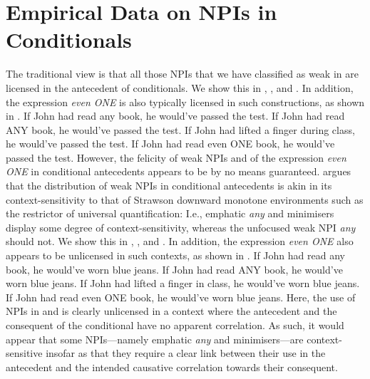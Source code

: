 \section{Empirical Data on NPIs in Conditionals}
The traditional view is that all those NPIs that we have classified as weak in  \parencite{Ladusaw1980,Wouden1997,Jeong2021,Jeong2022} are licensed in the antecedent of conditionals. We show this in , , and . In addition, the expression \textit{even \MakeUppercase{one}} is also typically licensed in such constructions, as shown in .
\pex[nopreamble=true]\label{ex:npi-conditional-good}%
\a{} If John had read any book, he would've passed the test.
\a{} If John had read \MakeUppercase{any} book, he would've passed the test.
\a{} If John had lifted a finger during class, he would've passed the test.
\a{} If John had read even \MakeUppercase{one} book, he would've passed the test.
\xe
However, the felicity of weak NPIs and of the expression \textit{even \MakeUppercase{one}} in conditional antecedents appears to be by no means guaranteed. \textcite[p.~122]{Crnic2014-dogma} argues that the distribution of weak NPIs in conditional antecedents is akin in its context-sensitivity to that of Strawson downward monotone environments such as the restrictor of universal quantification: I.e., emphatic \textit{any} and minimisers display some degree of context-sensitivity, whereas the unfocused weak NPI \textit{any} should not. We show this in , , and . In addition, the expression \textit{even \MakeUppercase{one}} also appears to be unlicensed in such contexts, as shown in .
\pex[nopreamble=true]\label{ex:npi-conditional-bad}%
\a{}\ljudge{} If John had read any book, he would've worn blue jeans.
\a{}\ljudge{\#} If John had read \MakeUppercase{any} book, he would've worn blue jeans.
\a{}\ljudge{\#} If John had lifted a finger in class, he would've worn blue jeans.
\a{}\ljudge{\#} If John had read even \MakeUppercase{one} book, he would've worn blue jeans.
\xe
Here, the use of NPIs in  and  is clearly unlicensed in a context where the antecedent and the consequent of the conditional have no apparent correlation. As such, it would appear that some NPIs---namely emphatic \textit{any} and minimisers---are context-sensitive insofar as that they require a clear link between their use in the antecedent and the intended causative correlation towards their consequent.

